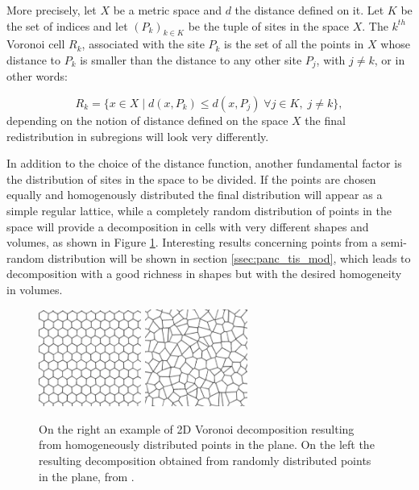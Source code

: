    More precisely, let $X$ be a metric space and $d$ the distance defined on it. Let $K$ be the set of indices and let $(P_k)_{k\in K}$ be the tuple of sites in the space $X$. The $k^{th}$ Voronoi cell $R_k$, associated with the site $P_k$ is the set of all the points in $X$ whose distance to $P_k$ is smaller than the distance to any other site $P_j$, with $j\neq k$, or in other words:

    \begin{equation}
        R_k = \{x \in X\;|\;d(x,P_k) \le d(x,P_j)\; \forall j \in K, \;j\neq k \}, \label{eq:formal_Vor_def}
    \end{equation}
    depending on the notion of distance defined on the space $X$ the final redistribution in subregions will look very differently.

    In addition to the choice of the distance function, another fundamental factor is the distribution of sites in the space to be divided. If the points are chosen equally and homogenously distributed the final distribution will appear as a simple regular lattice, while a completely random distribution of points in the space will provide a decomposition in cells with very different shapes and volumes, as shown in Figure \ref{fig:diff_pt}. Interesting results concerning points from a semi-random distribution will be shown in section \ref{ssec:panc_tis_mod}, which leads to decomposition with a good richness in shapes but with the desired homogeneity in volumes.

    \begin{figure}
        \centering
        \includegraphics[width = 0.3\textwidth]{images/reg_pt}
        \includegraphics[width = 0.3\textwidth]{images/ran_pt}
        \caption{On the right an example of 2D Voronoi decomposition resulting from homogeneously distributed points in the plane. On the left the resulting decomposition obtained from randomly distributed points in the plane, from \cite{ALSAYEDNOOR201644}.}
        \label{fig:diff_pt}
    \end{figure}

